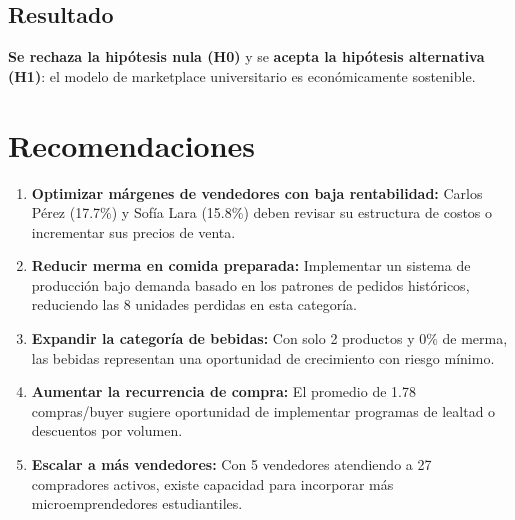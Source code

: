 \documentclass[12pt, a4paper]{article}
\begin{document}
\subsection{Resultado}

\begin{center}
\end{center}

\vspace{0.5cm}

\textbf{Se rechaza la hipótesis nula (H0)} y se \textbf{acepta la hipótesis alternativa (H1)}: el modelo de marketplace universitario es económicamente sostenible.

\section{Recomendaciones}

\begin{enumerate}
    \item \textbf{Optimizar márgenes de vendedores con baja rentabilidad:} Carlos Pérez (17.7\%) y Sofía Lara (15.8\%) deben revisar su estructura de costos o incrementar sus precios de venta.
    
    \item \textbf{Reducir merma en comida preparada:} Implementar un sistema de producción bajo demanda basado en los patrones de pedidos históricos, reduciendo las 8 unidades perdidas en esta categoría.
    
    \item \textbf{Expandir la categoría de bebidas:} Con solo 2 productos y 0\% de merma, las bebidas representan una oportunidad de crecimiento con riesgo mínimo.
    
    \item \textbf{Aumentar la recurrencia de compra:} El promedio de 1.78 compras/buyer sugiere oportunidad de implementar programas de lealtad o descuentos por volumen.
    
    \item \textbf{Escalar a más vendedores:} Con 5 vendedores atendiendo a 27 compradores activos, existe capacidad para incorporar más microemprendedores estudiantiles.
\end{enumerate}
\end{document}
